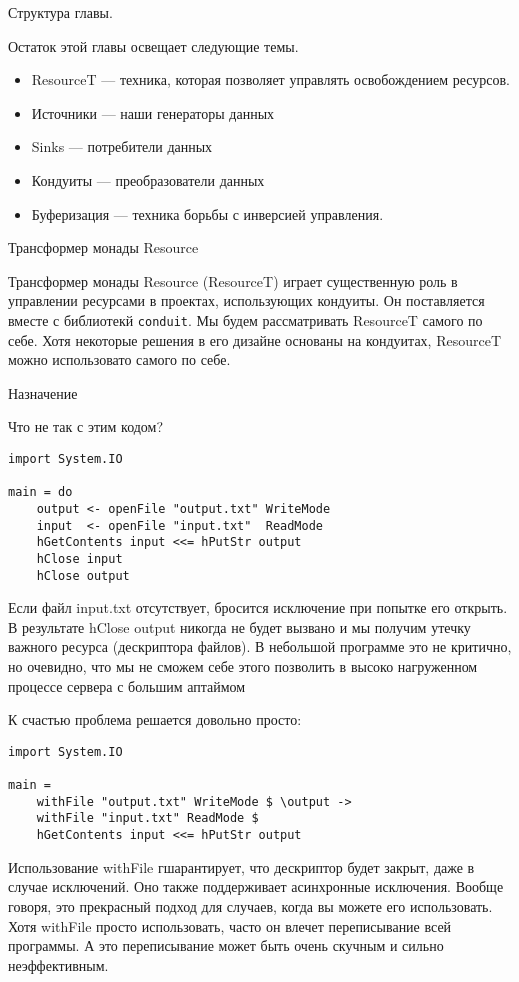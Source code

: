 Структура главы.

Остаток этой главы освещает следующие темы.
\begin{itemize}
 \item ResourceT --- техника, которая позволяет управлять освобождением ресурсов.
 \item Источники --- наши генераторы данных
 \item Sinks --- потребители данных
 \item Кондуиты --- преобразователи данных
 \item Буферизация --- техника борьбы с инверсией управления.
\end{itemize}

Трансформер монады Resource

Трансформер монады Resource (ResourceT) играет существенную роль в управлении ресурсами в
проектах, использующих кондуиты. Он поставляется вместе с библиотекй \verb=conduit=. Мы
будем рассматривать ResourceT самого по себе. Хотя некоторые решения в его дизайне
основаны на кондуитах, ResourceT можно использовато самого по себе.

Назначение

Что не так с этим кодом?
\begin{lstlisting}
import System.IO

main = do
    output <- openFile "output.txt" WriteMode
    input  <- openFile "input.txt"  ReadMode
    hGetContents input <<= hPutStr output
    hClose input
    hClose output
\end{lstlisting}

Если файл input.txt отсутствует, бросится исключение при попытке его открыть. В
результате hClose output никогда не будет вызвано и мы получим утечку важного ресурса
(дескриптора файлов). В небольшой программе это не критично, но очевидно, что мы не
сможем себе этого позволить в высоко нагруженном процессе сервера с большим аптаймом

К счастью проблема решается довольно просто:
\begin{lstlisting}
import System.IO

main =
    withFile "output.txt" WriteMode $ \output ->
    withFile "input.txt" ReadMode $ 
    hGetContents input <<= hPutStr output
\end{lstlisting}

Использование withFile гшарантирует, что дескриптор будет закрыт, даже в случае
исключений. Оно также поддерживает асинхронные исключения. Вообще говоря, это прекрасный
подход для случаев, когда вы можете его использовать. Хотя withFile просто использовать,
часто он влечет переписывание всей программы. А это переписывание может быть очень
скучным и сильно неэффективным.

